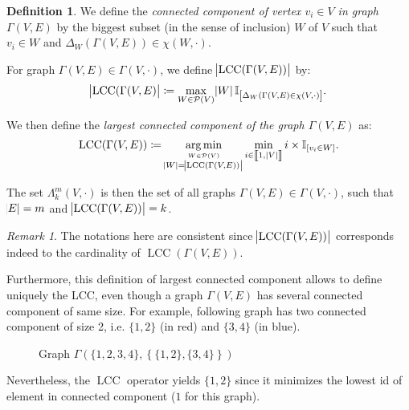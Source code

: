 \documentclass{article}
\theoremstyle{definition}
\newtheorem{definition}[lemma]{Definition}
\theoremstyle{remark}
\newtheorem*{remark}{Remark}
\DeclareMathOperator{\LCC}{LCC}
\DeclareMathOperator*{\argmin}{arg\,min}
\newcommand{\intint}[2]{\left\llbracket#1, \, #2\right\rrbracket}
\begin{document}
		\begin{definition} We define the \textit{connected component of vertex $v_i \in V$ in graph $\Gamma(V, E)$} by the biggest subset (in the sense of inclusion) $W$
		of $V$ such that $v_i \in W$ and $\Delta_W(\Gamma(V, E)) \in \chi(W, \cdot)$.

		For graph $\Gamma(V, E) \in \Gamma(V, \cdot)$, we define $\abs {\LCC(\Gamma(V, E))}$ by:
		\[\abs {\LCC(\Gamma(V, E)} \coloneqq \max_{W \in \mathcal P(V)}\abs W\mathbb I_{\left[\Delta_W(\Gamma(V, E) \in \chi(V, \cdot)\right]}.\]

		We then define the \textit{largest connected component of the graph $\Gamma(V, E)$} as:
		\[\LCC(\Gamma(V, E)) \coloneqq \argmin_{\stackrel {W \in \mathcal P(V)}{\abs W =
			\abs {\LCC(\Gamma(V, E))}}}\min_{i \in \intint 1{\abs V}}i \times \mathbb I_{[v_i \in W]}.\]

		The set $\Lambda_k^m(V, \cdot)$ is then the set of all graphs $\Gamma(V, E) \in \Gamma(V, \cdot)$, such that $\abs E = m$ and $\abs {\LCC(\Gamma(V, E))} = k$.
		\end{definition}

		\begin{remark} The notations here are consistent since $\abs {\LCC(\Gamma(V, E))}$ corresponds indeed to the cardinality of $\LCC(\Gamma(V, E))$.

		Furthermore, this definition of largest connected component allows to define uniquely the LCC, even though a graph $\Gamma(V, E)$ has several connected component
		of same size. For example, following graph has two connected component of size 2, i.e. $\{1, 2\}$ (in red) and $\{3, 4\}$ (in blue).

		\begin{figure}[H]
		\begin{center}
		\end{center}
		\caption{Graph $\Gamma\left(\{1, 2, 3, 4\}, \left\{\{1, 2\}, \{3, 4\}\right\}\right)$}
		\end{figure}

		Nevertheless, the $\LCC$ operator yields $\{1, 2\}$ since it minimizes the lowest id of element in connected component ($1$ for this graph).
		\end{remark}
\end{document}
